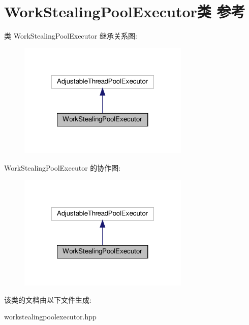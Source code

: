 \hypertarget{classWorkStealingPoolExecutor}{}\section{Work\+Stealing\+Pool\+Executor类 参考}
\label{classWorkStealingPoolExecutor}


类 Work\+Stealing\+Pool\+Executor 继承关系图\+:\nopagebreak
\begin{figure}[H]
\begin{center}
\leavevmode
\includegraphics[width=231pt]{classWorkStealingPoolExecutor__inherit__graph}
\end{center}
\end{figure}


Work\+Stealing\+Pool\+Executor 的协作图\+:\nopagebreak
\begin{figure}[H]
\begin{center}
\leavevmode
\includegraphics[width=231pt]{classWorkStealingPoolExecutor__coll__graph}
\end{center}
\end{figure}


该类的文档由以下文件生成\+:\begin{DoxyCompactItemize}
\item 
workstealingpoolexecutor.\+hpp\end{DoxyCompactItemize}
